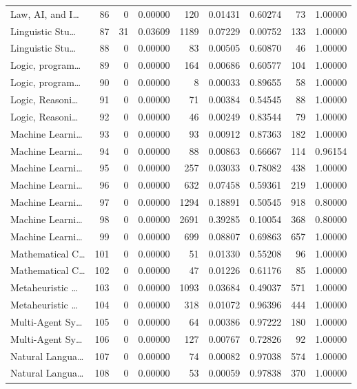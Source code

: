 \begin{table}
\begin{tabular}{lrrrrrrrr}
Law, AI, and I… & 86 & 0 & 0.00000 & 120 & 0.01431 & 0.60274 & 73 & 1.00000 \\
Linguistic Stu… & 87 & 31 & 0.03609 & 1189 & 0.07229 & 0.00752 & 133 & 1.00000 \\
Linguistic Stu… & 88 & 0 & 0.00000 & 83 & 0.00505 & 0.60870 & 46 & 1.00000 \\
Logic, program… & 89 & 0 & 0.00000 & 164 & 0.00686 & 0.60577 & 104 & 1.00000 \\
Logic, program… & 90 & 0 & 0.00000 & 8 & 0.00033 & 0.89655 & 58 & 1.00000 \\
Logic, Reasoni… & 91 & 0 & 0.00000 & 71 & 0.00384 & 0.54545 & 88 & 1.00000 \\
Logic, Reasoni… & 92 & 0 & 0.00000 & 46 & 0.00249 & 0.83544 & 79 & 1.00000 \\
Machine Learni… & 93 & 0 & 0.00000 & 93 & 0.00912 & 0.87363 & 182 & 1.00000 \\
Machine Learni… & 94 & 0 & 0.00000 & 88 & 0.00863 & 0.66667 & 114 & 0.96154 \\
Machine Learni… & 95 & 0 & 0.00000 & 257 & 0.03033 & 0.78082 & 438 & 1.00000 \\
Machine Learni… & 96 & 0 & 0.00000 & 632 & 0.07458 & 0.59361 & 219 & 1.00000 \\
Machine Learni… & 97 & 0 & 0.00000 & 1294 & 0.18891 & 0.50545 & 918 & 0.80000 \\
Machine Learni… & 98 & 0 & 0.00000 & 2691 & 0.39285 & 0.10054 & 368 & 0.80000 \\
Machine Learni… & 99 & 0 & 0.00000 & 699 & 0.08807 & 0.69863 & 657 & 1.00000 \\
Mathematical C… & 101 & 0 & 0.00000 & 51 & 0.01330 & 0.55208 & 96 & 1.00000 \\
Mathematical C… & 102 & 0 & 0.00000 & 47 & 0.01226 & 0.61176 & 85 & 1.00000 \\
Metaheuristic … & 103 & 0 & 0.00000 & 1093 & 0.03684 & 0.49037 & 571 & 1.00000 \\
Metaheuristic … & 104 & 0 & 0.00000 & 318 & 0.01072 & 0.96396 & 444 & 1.00000 \\
Multi-Agent Sy… & 105 & 0 & 0.00000 & 64 & 0.00386 & 0.97222 & 180 & 1.00000 \\
Multi-Agent Sy… & 106 & 0 & 0.00000 & 127 & 0.00767 & 0.72826 & 92 & 1.00000 \\
Natural Langua… & 107 & 0 & 0.00000 & 74 & 0.00082 & 0.97038 & 574 & 1.00000 \\
Natural Langua… & 108 & 0 & 0.00000 & 53 & 0.00059 & 0.97838 & 370 & 1.00000 \\

\end{tabular}
\end{table}
